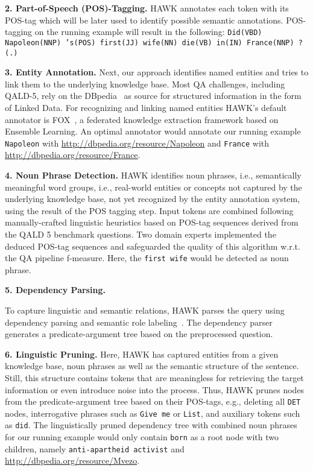 \documentclass{llncs}
\begin{document}
\textbf{2. Part-of-Speech (POS)-Tagging.} 
HAWK annotates each token with its POS-tag which will be later used to identify possible semantic annotations. 
POS-tagging on the running example will result in the following: \texttt{Did(VBD) Napoleon(NNP) 's(POS) first(JJ) wife(NN) die(VB) in(IN) France(NNP) ?(.)}

\textbf{3. Entity Annotation.} 
Next, our approach identifies named entities and tries to link them to the underlying knowledge base. 
Most QA challenges, including QALD-5, rely on the DBpedia~\cite{jl_2014/swj_dbpedia} as source for structured information in the form of Linked Data. 
For recognizing and linking named entities HAWK's default annotator is FOX~\cite{FOX}, a federated knowledge extraction framework based on Ensemble Learning. 
An optimal annotator would annotate our running example \texttt{Napoleon} with \url{http://dbpedia.org/resource/Napoleon} and \texttt{France} with \url{http://dbpedia.org/resource/France}.

\textbf{4. Noun Phrase Detection.}
HAWK identifies noun phrases, i.e., semantically meaningful word groups, i.e., real-world entities or concepts not captured by the underlying knowledge base, not yet recognized by the entity annotation system, using the result of the POS tagging step. 
Input tokens are combined following manually-crafted linguistic heuristics based on POS-tag sequences derived from the QALD 5 benchmark questions. %
Two domain experts implemented the deduced POS-tag sequences and safeguarded the quality of this algorithm w.r.t. the QA pipeline f-measure. 
Here, the \texttt{first wife} would be detected as noun phrase.

\textbf{5. Dependency Parsing.}

To capture linguistic and semantic relations, HAWK parses the query using dependency parsing and semantic role labeling~\cite{choi2011getting}.
The dependency parser generates a predicate-argument tree based on the preprocessed question.

\textbf{6. Linguistic Pruning.}
Here, HAWK has captured entities from a given knowledge base, noun phrases as well as the semantic structure of the sentence. 
Still, this structure contains tokens that are meaningless for retrieving the target information or even introduce noise into the process.
Thus, HAWK prunes nodes from the predicate-argument tree based on their POS-tags, e.g., deleting all \texttt{DET} nodes, interrogative phrases such as \texttt{Give me} or \texttt{List}, and auxiliary tokens such as \texttt{did}.
The linguistically pruned dependency tree with combined noun phrases for our running example would only contain \texttt{born} as a root node with two children, namely \texttt{anti-apartheid activist} and \url{http://dbpedia.org/resource/Mvezo}.
\end{document}
